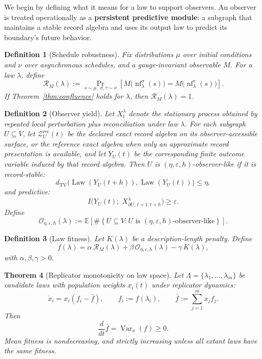 \documentclass[11pt]{article}
\newtheorem{theorem}{Theorem}[section]
\newtheorem{definition}[theorem]{Definition}
\theoremstyle{remark}
\theoremstyle{plain}
\begin{document}
We begin by defining what it means for a law to support observers. An observer is treated
operationally as a \textbf{persistent predictive module}: a subgraph that maintains a stable
record algebra and uses its output law to predict its boundary's future behavior.

\begin{definition}[Schedule robustness]\label{def:robustness}
Fix distributions $\mu$ over initial conditions and $\nu$ over asynchronous schedules, and a gauge-invariant observable $M$. For a law $\lambda$, define
\[
\mathcal{R}_M(\lambda)
:=
\Pr_{s\sim\mu,\;\sigma,\tau\sim\nu}
\!\left[
M\bigl(\operatorname{nf}^{\sigma}_\lambda(s)\bigr)
=
M\bigl(\operatorname{nf}^{\tau}_\lambda(s)\bigr)
\right].
\]
If Theorem~\ref{thm:confluence} holds for $\lambda$, then $\mathcal{R}_M(\lambda)=1$.
\end{definition}

\begin{definition}[Observer yield]\label{def:yield}
Let $X_t^\lambda$ denote the stationary process obtained by repeated local perturbation plus
reconciliation under law $\lambda$. For each subgraph $U\subseteq V$, let
\(\mathcal Z_U^{\mathrm{rec}}(t)\) be the declared exact record algebra on its observer-accessible
surface, or the reference exact algebra when only an approximate record presentation is available,
and let $Y_U(t)$ be the corresponding finite outcome variable induced by that record algebra. Then $U$ is
\((\eta,\varepsilon,h)\)-observer-like if it is record-stable:
\[
d_{\mathrm{TV}}\!\bigl(\operatorname{Law}(Y_U(t+h)),\operatorname{Law}(Y_U(t))\bigr)\le \eta,
\]
and predictive:
\[
I\bigl(Y_U(t);\; X_{\partial U,\,t+1:t+h}^\lambda\bigr)\ge\varepsilon.
\]
Define
\[
\mathcal{O}_{\eta,\varepsilon,h}(\lambda)
:=
\mathbb{E}\!\left[
\#\left\{
U\subseteq V:
U \text{ is } (\eta,\varepsilon,h)\text{-observer-like}
\right\}
\right].
\]
\end{definition}

\begin{definition}[Law fitness]\label{def:fitness}
Let $K(\lambda)$ be a description-length penalty. Define
\[
f(\lambda) = \alpha\,\mathcal{R}_M(\lambda) + \beta\,\mathcal{O}_{\eta,\varepsilon,h}(\lambda) - \gamma\,K(\lambda),
\]
with $\alpha,\beta,\gamma>0$.
\end{definition}

\begin{theorem}[Replicator monotonicity on law space]\label{thm:replicator}
Let $\Lambda=\{\lambda_1,\dots,\lambda_m\}$ be candidate laws with population weights $x_i(t)$ under replicator dynamics:
\[
\dot{x}_i = x_i(f_i - \bar{f}),
\qquad
f_i := f(\lambda_i),
\qquad
\bar{f} := \sum_{j=1}^m x_j f_j.
\]
Then
\[
\frac{d}{dt}\bar{f} = \operatorname{Var}_x(f) \ge 0.
\]
Mean fitness is nondecreasing, and strictly increasing unless all extant laws have the same fitness.
\end{theorem}
\end{document}
